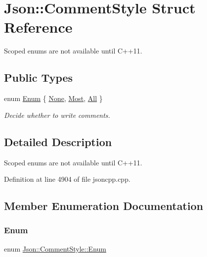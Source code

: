 \hypertarget{struct_json_1_1_comment_style}{}\section{Json\+:\+:Comment\+Style Struct Reference}
\label{struct_json_1_1_comment_style}


Scoped enums are not available until C++11.  


\subsection*{Public Types}
\begin{DoxyCompactItemize}
\item 
enum \hyperlink{struct_json_1_1_comment_style_a51fc08f3518fd81eba12f340d19a3d0c}{Enum} \{ \hyperlink{struct_json_1_1_comment_style_a51fc08f3518fd81eba12f340d19a3d0cac8b32a8bae63414c8647d4919da8d437}{None}, 
\hyperlink{struct_json_1_1_comment_style_a51fc08f3518fd81eba12f340d19a3d0cac65238f050773c107690a456e9c05c98}{Most}, 
\hyperlink{struct_json_1_1_comment_style_a51fc08f3518fd81eba12f340d19a3d0ca32302c0b97190c1808b3e38f367fef01}{All}
 \}\begin{DoxyCompactList}\small\item\em Decide whether to write comments. \end{DoxyCompactList}
\end{DoxyCompactItemize}


\subsection{Detailed Description}
Scoped enums are not available until C++11. 

Definition at line 4904 of file jsoncpp.\+cpp.



\subsection{Member Enumeration Documentation}
\hypertarget{struct_json_1_1_comment_style_a51fc08f3518fd81eba12f340d19a3d0c}{}\label{struct_json_1_1_comment_style_a51fc08f3518fd81eba12f340d19a3d0c} 
\subsubsection{\texorpdfstring{Enum}{Enum}}
{\footnotesize\ttfamily enum \hyperlink{struct_json_1_1_comment_style_a51fc08f3518fd81eba12f340d19a3d0c}{Json\+::\+Comment\+Style\+::\+Enum}}



